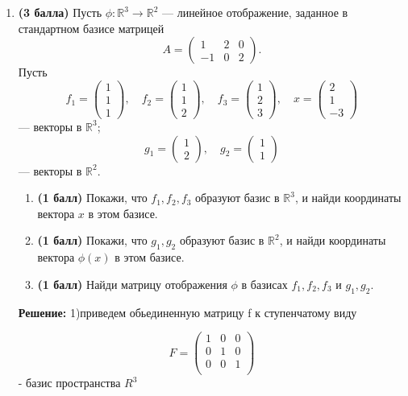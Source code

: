 \documentclass[a4paper,12pt]{article}
\begin{document}
\begin{enumerate}

    \item \textbf{(3 балла)} Пусть $\phi: \mathbb{R}^3 \to \mathbb{R}^2$ — линейное отображение, заданное в стандартном базисе матрицей
    \[
    A = \begin{pmatrix}
    1 & 2 & 0 \\
    -1 & 0 & 2 
    \end{pmatrix}.
    \]
    Пусть 
    \[
    f_1 = \begin{pmatrix} 1 \\ 1 \\ 1 \end{pmatrix}, \quad
    f_2 = \begin{pmatrix} 1 \\ 1 \\ 2 \end{pmatrix}, \quad
    f_3 = \begin{pmatrix} 1 \\ 2 \\ 3 \end{pmatrix}, \quad
    x = \begin{pmatrix} 2 \\ 1 \\ -3 \end{pmatrix}
    \]
    — векторы в $\mathbb{R}^3$; 
    \[
    g_1 = \begin{pmatrix} 1 \\ 2 \end{pmatrix}, \quad
    g_2 = \begin{pmatrix} 1 \\ 1 \end{pmatrix}
    \]
    — векторы в $\mathbb{R}^2$.
    \begin{enumerate}
        \item \textbf{(1 балл)} Покажи, что $f_1, f_2, f_3$ образуют базис в $\mathbb{R}^3$, и найди координаты вектора $x$ в этом базисе.
        \item \textbf{(1 балл)} Покажи, что $g_1, g_2$ образуют базис в $\mathbb{R}^2$, и найди координаты вектора $\phi(x)$ в этом базисе.
        \item \textbf{(1 балл)} Найди матрицу отображения $\phi$ в базисах $f_1, f_2, f_3$ и $g_1, g_2$.
    \end{enumerate}

\textbf{Решение: }
1)приведем обьединенную матрицу f к ступенчатому виду

\[
F = \begin{pmatrix}
    1 & 0 & 0 \\
    0 & 1 & 0 \\
    0 & 0 & 1 \\
\end{pmatrix}
\] - базис пространства $R^3$


\end{enumerate}
\end{document}
